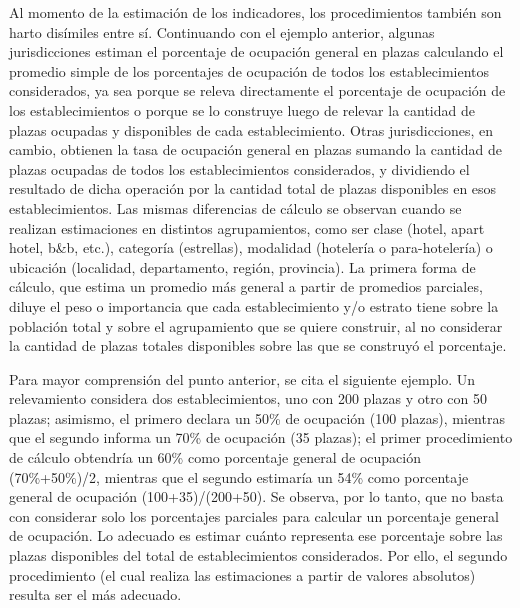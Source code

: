 \documentclass[
]{book}
\begin{document}
Al momento de la estimación de los indicadores, los procedimientos también son harto disímiles entre sí. Continuando con el ejemplo anterior, algunas jurisdicciones estiman el porcentaje de ocupación general en plazas calculando el promedio simple de los porcentajes de ocupación de todos los establecimientos considerados, ya sea porque se releva directamente el porcentaje de ocupación de los establecimientos o porque se lo construye luego de relevar la cantidad de plazas ocupadas y disponibles de cada establecimiento. Otras jurisdicciones, en cambio, obtienen la tasa de ocupación general en plazas sumando la cantidad de plazas ocupadas de todos los establecimientos considerados, y dividiendo el resultado de dicha operación por la cantidad total de plazas disponibles en esos establecimientos. Las mismas diferencias de cálculo se observan cuando se realizan estimaciones en distintos agrupamientos, como ser clase (hotel, apart hotel, b\&b, etc.), categoría (estrellas), modalidad (hotelería o para-hotelería) o ubicación (localidad, departamento, región, provincia). La primera forma de cálculo, que estima un promedio más general a partir de promedios parciales, diluye el peso o importancia que cada establecimiento y/o estrato tiene sobre la población total y sobre el agrupamiento que se quiere construir, al no considerar la cantidad de plazas totales disponibles sobre las que se construyó el porcentaje.

Para mayor comprensión del punto anterior, se cita el siguiente ejemplo. Un relevamiento considera dos establecimientos, uno con 200 plazas y otro con 50 plazas; asimismo, el primero declara un 50\% de ocupación (100 plazas), mientras que el segundo informa un 70\% de ocupación (35 plazas); el primer procedimiento de cálculo obtendría un 60\% como porcentaje general de ocupación (70\%+50\%)/2, mientras que el segundo estimaría un 54\% como porcentaje general de ocupación (100+35)/(200+50). Se observa, por lo tanto, que no basta con considerar solo los porcentajes parciales para calcular un porcentaje general de ocupación. Lo adecuado es estimar cuánto representa ese porcentaje sobre las plazas disponibles del total de establecimientos considerados. Por ello, el segundo procedimiento (el cual realiza las estimaciones a partir de valores absolutos) resulta ser el más adecuado.
\end{document}
